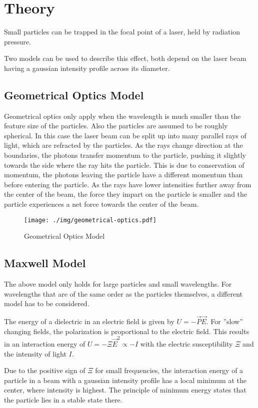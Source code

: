 \chapter{Theory}
Small particles can be trapped in the focal point of a laser, held by radiation pressure.

Two models can be used to describe this effect, both depend on the laser beam having a gaussian intensity profile across its diameter.

\section{Geometrical Optics Model}
Geometrical optics only apply when the wavelength is much smaller than the feature size of the particles.
Also the particles are assumed to be roughly spherical.
In this case the laser beam can be split up into many parallel rays of light, which are refracted by the particles.
As the rays change direction at the boundaries, the photons transfer momentum to the particle, pushing it slightly towards the side where the ray hits the particle.
This is due to conservation of momentum, the photons leaving the particle have a different momentum than before entering the particle.
As the rays have lower intensities further away from the center of the beam, the force they impart on the particle is smaller and the particle experiences a net force towards the center of the beam.
\begin{figure}[bp]
  \centering
  \texttt{[image: ./img/geometrical-optics.pdf]}
  \caption{Geometrical Optics Model}
\end{figure}

\section{Maxwell Model}
The above model only holds for large particles and small wavelengths.
For wavelengths that are of the same order as the particles themselves, a different model has to be considered.

The energy of a dielectric in an electric field is given by $U = -\vec{P}\vec{E}$.
For ''slow'' changing fields, the polarization is proportional to the electric field.
This results in an interaction energy of $U = -\Xi \vec{E}^2 \propto -I$ with the electric susceptibility $\Xi$ and the intensity of light $I$.

Due to the positive sign of $\Xi$ for small frequencies, the interaction energy of a particle in a beam with a gaussian intensity profile has a local minimum at the center, where intensity is highest.
The principle of minimum energy states that the particle lies in a stable state there. 


